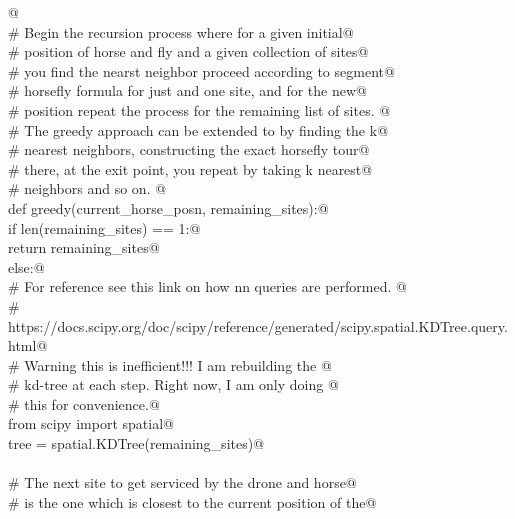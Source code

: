 \documentclass[11.5pt]{report}
\begin{document}
\begin{flushleft}
\begin{list}{}{}
\mbox{}\verb@      @\\
\mbox{}\verb@      # Begin the recursion process where for a given initial@\\
\mbox{}\verb@      # position of horse and fly and a given collection of sites@\\
\mbox{}\verb@      # you find the nearst neighbor proceed according to segment@\\
\mbox{}\verb@      # horsefly formula for just and one site, and for the new@\\
\mbox{}\verb@      # position repeat the process for the remaining list of sites. @\\
\mbox{}\verb@      # The greedy approach can be extended to by finding the k@\\
\mbox{}\verb@      # nearest neighbors, constructing the exact horsefly tour@\\
\mbox{}\verb@      # there, at the exit point, you repeat by taking k nearest@\\
\mbox{}\verb@      # neighbors and so on. @\\
\mbox{}\verb@      def greedy(current_horse_posn, remaining_sites):@\\
\mbox{}\verb@            if len(remaining_sites) == 1:@\\
\mbox{}\verb@                  return remaining_sites@\\
\mbox{}\verb@            else:@\\
\mbox{}\verb@                  # For reference see this link on how nn queries are performed. @\\
\mbox{}\verb@                  # https://docs.scipy.org/doc/scipy/reference/generated/scipy.spatial.KDTree.query.html@\\
\mbox{}\verb@                  # Warning this is inefficient!!! I am rebuilding the @\\
\mbox{}\verb@                  # kd-tree at each step. Right now, I am only doing @\\
\mbox{}\verb@                  # this for convenience.@\\
\mbox{}\verb@                  from scipy import spatial@\\
\mbox{}\verb@                  tree = spatial.KDTree(remaining_sites)@\\
\mbox{}\verb@@\\
\mbox{}\verb@                  # The next site to get serviced by the drone and horse@\\
\mbox{}\verb@                  # is the one which is closest to the current position of the@\\

\end{list}
\end{flushleft}
\end{document}
